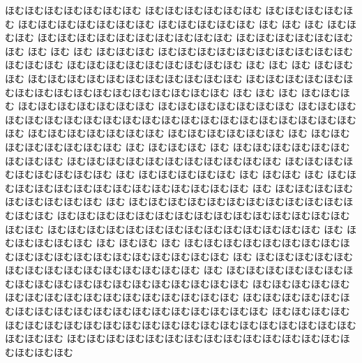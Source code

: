 \documentclass[a4paper]{article}
\begin{document}
\begin{prochomuhomu}{\NabeAzz}
ほむほむほむほむほむほむほむ ほむほむほむほむほむほむ ほむほむほむほむほむ ほむほむほむほむほむほむほむ ほむほむほむほむほむ ほむ ほむ ほむ ほむほむほむ ほむほむほむほむほむほむほむほむほむほむ ほむほむほむほむほむほむほむ ほむ ほむ ほむ ほむほむほむ ほむほむほむほむほむほむほむほむほむほむほむほむほむ ほむほむほむほむほむほむほむほむほむ ほむ ほむ ほむ ほむほむほむ ほむほむほむほむほむほむほむほむほむほむほむ ほむほむほむほむほむほむほむほむほむほむほむほむほむほむほむほむほむ ほむ ほむ ほむ ほむほむほむ
ほむほむほむほむほむほむほむ ほむほむほむほむほむほむほむ ほむほむほむほむほむほむほむほむほむほむほむほむほむほむほむほむほむほむほむほむほむほむ ほむほむほむほむほむほむほむ ほむほむほむほむほむほむ ほむ ほむほむほむほむほむほむほむほむ ほむ ほむほむほむ ほむ ほむほむほむほむほむほむほむほむほむ ほむほむほむほむほむほむほむほむほむほむほむ ほむほむほむほむほむほむほむほむほむ ほむ ほむほむほむほむほむ ほむ ほむほむ ほむ ほむほむほむほむほむほむほむほむほむほむほむほむほむほむ ほむ ほむほむほむほむほむほむほむほむほむ ほむ ほむほむほむほむほむほむほむほむほむほむほむほむほむほむ ほむほむほむほむほむほむほむほむほむほむほむほむほむほむほむほむほむ ほむほむほむほむほむほむほむほむほむほむほむほむほむほむ ほむ ほむほむほむほむほむ ほむ ほむほむ ほむ ほむほむほむほむほむほむほむほむほむほむほむほむほむほむほむほむほむほむほむほむ ほむ ほむほむほむほむほむほむほむほむほむほむほむほむほむほむほむ ほむ ほむほむほむほむほむほむほむほむほむほむほむほむほむほむほむほむほむほむほむ ほむほむほむほむほむほむほむほむほむほむほむほむほむほむほむほむほむ ほむほむほむほむほむほむほむほむほむほむほむほむほむほむほむほむほむほむほむ ほむほむほむほむほむほむほむほむほむほむほむほむほむほむほむほむほむほむほむほむほむほむほむほむほむ ほむほむほむほむほむほむほむほむほむほむほむほむほむほむほむほむほむほむ

\end{prochomuhomu}
\end{document}
